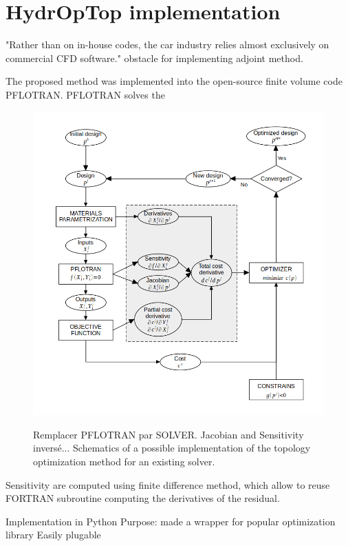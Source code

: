 \documentclass[11pt]{article}
\begin{document}
\section{HydrOpTop implementation}

"Rather than on in-house codes, the car industry relies almost exclusively on commercial CFD software." obstacle for implementing adjoint method. %

The proposed method was implemented into the open-source finite volume code PFLOTRAN. PFLOTRAN solves the 

\begin{figure}[]
  \centering
  \includegraphics[width=\textwidth]{figures/implementation_scheme.png}
  \label{cases_figure}
  \caption{Remplacer PFLOTRAN par SOLVER. Jacobian and Sensitivity inversé... Schematics of a possible implementation of the topology optimization method for an existing solver.}
\end{figure}

Sensitivity are computed using finite difference method, which allow to reuse FORTRAN subroutine computing the derivatives of the residual.

Implementation in Python
Purpose: made a wrapper for popular optimization library
Easily plugable
\end{document}
